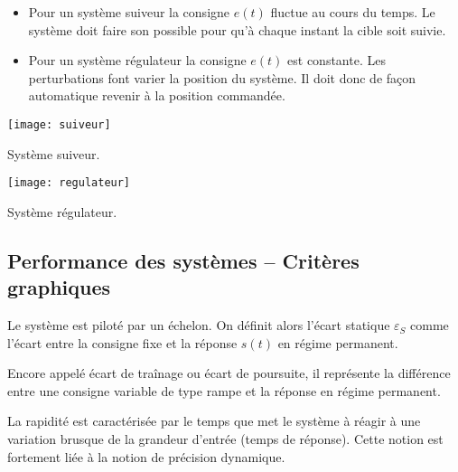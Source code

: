 \begin{defi}
\begin{itemize}
\item Pour un système suiveur la consigne $e(t)$ fluctue au cours du temps. Le système doit faire son possible pour qu'à chaque instant la cible soit suivie.
\item Pour un système régulateur la consigne $e(t)$ est constante. Les perturbations font varier la position du système. Il doit donc de façon automatique revenir à la position commandée.
\end{itemize}
\end{defi}


\begin{marginfigure}
\texttt{[image: suiveur]}
\caption{Système suiveur.}
\end{marginfigure}


\begin{marginfigure}
\texttt{[image: regulateur]}
\caption{Système régulateur.}
\end{marginfigure}

\subsection{Performance des systèmes -- Critères graphiques}

\begin{defi}

Le système est piloté par un échelon. On définit alors l'écart statique $\varepsilon_S$ comme l'écart entre la consigne fixe et la réponse $s(t)$ en régime permanent.
\end{defi}

\begin{defi}

Encore appelé écart de traînage ou écart de poursuite, il représente la différence entre une consigne variable de type rampe et la réponse en régime permanent. 
\end{defi}

\begin{defi}[Rapidité]

La rapidité est caractérisée par le temps que met le système à réagir à une
variation brusque de la grandeur d'entrée (temps de réponse). Cette notion est
fortement liée à la notion de précision dynamique.
\end{defi}

